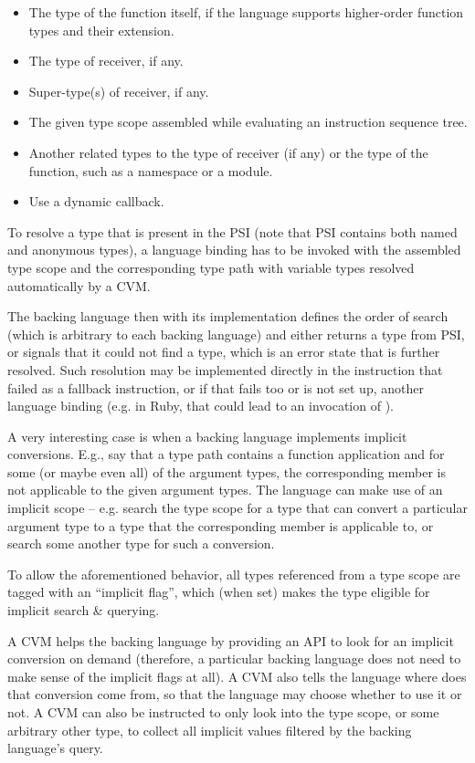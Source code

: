 \begin{itemize}
\item The type of the function itself, if the language supports higher-order function types and their extension. 
\item The type of receiver, if any. 
\item Super-type(s) of receiver, if any. 
\item The given type scope assembled while evaluating an instruction sequence tree. 
\item Another related types to the type of receiver (if any) or the type of the function, such as a namespace or a module. 
\item Use a dynamic callback. 
\end{itemize}

To resolve a type that is present in the PSI (note that PSI contains both named and anonymous types), a language binding has to be invoked with the assembled type scope and the corresponding type path with variable types resolved automatically by a CVM. 

The backing language then with its implementation defines the order of search (which is arbitrary to each backing language) and either returns a type from PSI, or signals that it could not find a type, which is an error state that is further resolved. Such resolution may be implemented directly in the instruction that failed as a fallback instruction, or if that fails too or is not set up, another language binding (e.g. in Ruby, that could lead to an invocation of ). 

A very interesting case is when a backing language implements implicit conversions. E.g., say that a type path contains a function application and for some (or maybe even all) of the argument types, the corresponding member is not applicable to the given argument types. The language can make use of an implicit scope -- e.g. search the type scope for a type that can convert a particular argument type to a type that the corresponding member is applicable to, or search some another type for such a conversion. 

To allow the aforementioned behavior, all types referenced from a type scope are tagged with an ``implicit flag'', which (when set) makes the type eligible for implicit search \& querying. 

A CVM helps the backing language by providing an API to look for an implicit conversion on demand (therefore, a particular backing language does not need to make sense of the implicit flags at all). A CVM also tells the language where does that conversion come from, so that the language may choose whether to use it or not. A CVM can also be instructed to only look into the type scope, or some arbitrary other type, to collect all implicit values filtered by the backing language's query. 

